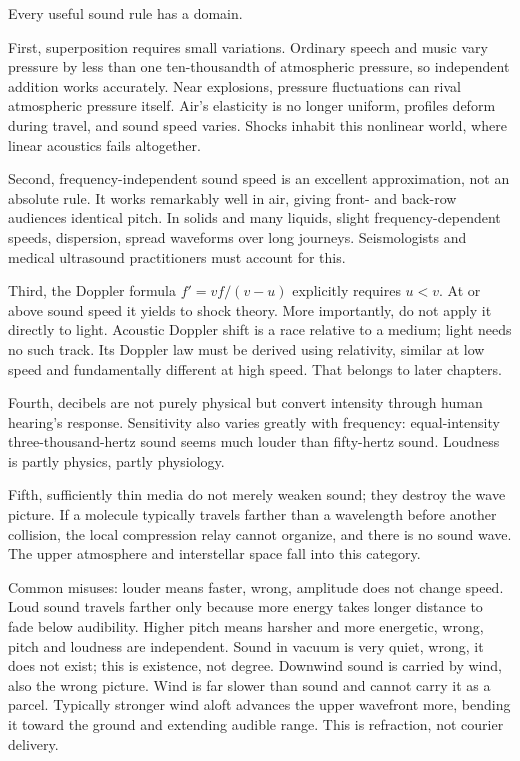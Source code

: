 \begin{mainline}
Every useful sound rule has a domain.

First, superposition requires small variations. Ordinary speech and music vary pressure by less than one ten-thousandth of atmospheric pressure, so independent addition works accurately. Near explosions, pressure fluctuations can rival atmospheric pressure itself. Air's elasticity is no longer uniform, profiles deform during travel, and sound speed varies. Shocks inhabit this nonlinear world, where linear acoustics fails altogether.

Second, frequency-independent sound speed is an excellent approximation, not an absolute rule. It works remarkably well in air, giving front- and back-row audiences identical pitch. In solids and many liquids, slight frequency-dependent speeds, dispersion, spread waveforms over long journeys. Seismologists and medical ultrasound practitioners must account for this.

Third, the Doppler formula \(f'=vf/(v-u)\) explicitly requires \(u<v\). At or above sound speed it yields to shock theory. More importantly, do not apply it directly to light. Acoustic Doppler shift is a race relative to a medium; light needs no such track. Its Doppler law must be derived using relativity, similar at low speed and fundamentally different at high speed. That belongs to later chapters.

Fourth, decibels are not purely physical but convert intensity through human hearing's response. Sensitivity also varies greatly with frequency: equal-intensity three-thousand-hertz sound seems much louder than fifty-hertz sound. Loudness is partly physics, partly physiology.

Fifth, sufficiently thin media do not merely weaken sound; they destroy the wave picture. If a molecule typically travels farther than a wavelength before another collision, the local compression relay cannot organize, and there is no sound wave. The upper atmosphere and interstellar space fall into this category.

Common misuses: louder means faster, wrong, amplitude does not change speed. Loud sound travels farther only because more energy takes longer distance to fade below audibility. Higher pitch means harsher and more energetic, wrong, pitch and loudness are independent. Sound in vacuum is very quiet, wrong, it does not exist; this is existence, not degree. Downwind sound is carried by wind, also the wrong picture. Wind is far slower than sound and cannot carry it as a parcel. Typically stronger wind aloft advances the upper wavefront more, bending it toward the ground and extending audible range. This is refraction, not courier delivery.
\end{mainline}

